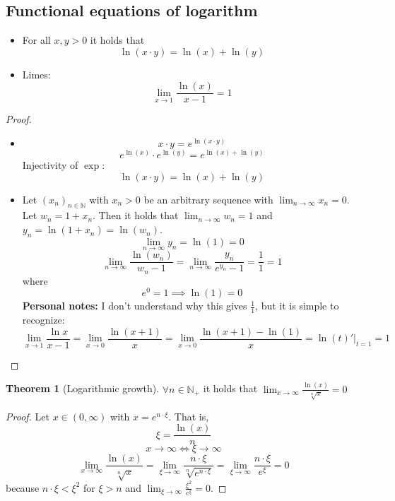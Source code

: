 \documentclass[a4paper,landscape,twocolumn]{article}
\theoremstyle{definition}
\newtheorem{theorem}{Theorem}
\begin{document}
\subsection{Functional equations of logarithm}
%
\begin{itemize}
  \item
    For all $x,y > 0$ it holds that
    \[ \ln(x \cdot y) = \ln(x) + \ln(y) \]
  \item Limes:
    \[ \lim_{x \to 1} \frac{\ln(x)}{x - 1} = 1 \]
\end{itemize}
\begin{proof}
  \begin{itemize}
    \item
      \[ x \cdot y = e^{\ln(x \cdot y)} \]
      \[ e^{\ln(x)} \cdot e^{\ln(y)} = e^{\ln(x) + \ln(y)} \]
      Injectivity of $\exp$:
      \[ \ln(x \cdot y) = \ln(x) + \ln(y) \]
    \item
      Let $(x_n)_{n\in\mathbb N}$ with $x_n > 0$ be an arbitrary
      sequence with $\lim_{n\to\infty} x_n = 0$.
      Let $w_n = 1 + x_n$. Then it holds that
      $\lim_{n\to\infty} w_n = 1$ and $y_n = \ln(1 + x_n) = \ln(w_n)$.
      \[ \lim_{n\to\infty} y_n = \ln(1) = 0 \]
      \[ \lim_{n\to\infty} \frac{\ln(w_n)}{w_n - 1} = \lim_{n\to\infty} \frac{y_n}{e^{y_n} - 1} = \frac11 = 1 \]
      where
      \[ e^0 = 1 \implies \ln(1) = 0 \]
      \textbf{Personal notes:}
      I don't understand why this gives $\frac11$, but it is simple to recognize:
      \[ \lim_{x\to1} \frac{\ln{x}}{x-1} = \lim_{x\to0} \frac{\ln(x+1)}{x} = \lim_{x\to0} \frac{\ln(x+1) - \ln(1)}{x} = \left.\ln(t)'\right|_{t=1} = 1 \]
  \end{itemize}
\end{proof}

\begin{theorem}[Logarithmic growth]
  $\forall n \in \mathbb N_+$ it holds that $\lim_{x\to\infty} \frac{\ln(x)}{\sqrt[n]{x}} = 0$
\end{theorem}
\begin{proof}
  Let $x \in (0,\infty)$ with $x = e^{n\cdot\xi}$. That is,
  \[ \xi = \frac{\ln(x)}{n} \]
  \[ x \to \infty \Leftrightarrow \xi \to \infty \]
  \[
    \lim_{x\to\infty} \frac{\ln(x)}{\sqrt[n]{x}}
    = \lim_{\xi\to\infty} \frac{n \cdot \xi}{\sqrt[n]{e^{n \cdot \xi}}}
    = \lim_{\xi\to\infty} \frac{n \cdot \xi}{e^\xi} = 0
  \]
  because $n \cdot \xi < \xi^2$ for $\xi > n$ and $\lim_{\xi\to\infty} \frac{\xi^2}{e^\xi} = 0$.
\end{proof}
\end{document}
